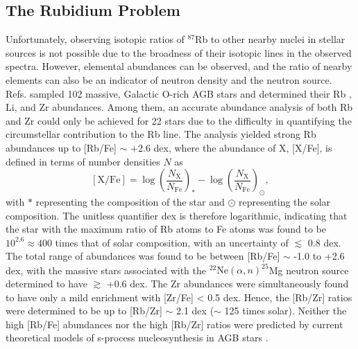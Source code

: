 \subsection{The Rubidium Problem} \label{subsec:Rb_Problem}


Unfortunately, observing isotopic ratios of $^{87}$Rb to other nearby nuclei in stellar sources is not possible due to the broadness of their isotopic lines in the observed spectra. However, elemental abundances can be observed, and the ratio of nearby elements can also be an indicator of neutron density and the neutron source. Refs. \cite{Garcia2006,Garcia2007} sampled 102 massive, Galactic O-rich AGB stars and determined their Rb \cite{Garcia2006}, Li, and Zr \cite{Garcia2007} abundances. Among them, an accurate abundance analysis of both Rb and Zr could only be achieved for 22 stars due to the difficulty in quantifying the circumstellar contribution to the Rb line. The analysis yielded strong Rb abundances up to [Rb/Fe] $\sim$ +2.6 dex, where the abundance of X, [X/Fe], is defined in terms of number densities $N$ as
\begin{equation} \label{eqn:abundance}
[\mathrm{X}/\mathrm{Fe}] = \log\left( \frac{N_{\mathrm{X}}}{N_{\mathrm{Fe}}} \right)_{\ast} - \log\left( \frac{N_{\mathrm{X}}}{N_{\mathrm{Fe}}} \right)_{\odot},
\end{equation}
with $\ast$ representing the composition of the star and $\odot$ representing the solar composition. The unitless quantifier dex is therefore logarithmic, indicating that the star with the maximum ratio of  Rb atoms to Fe atoms was found to be $10^{2.6} \approx 400$ times that of solar composition, with an uncertainty of $\lesssim$ 0.8 dex. The total range of abundances was found to be between [Rb/Fe] $\sim$ -1.0 to +2.6 dex, with the massive stars associated with the $^{22}\mathrm{Ne}(\alpha,n)^{25}$Mg neutron source determined to have $\gtrsim$ +0.6 dex. The Zr abundances were simultaneously found to have only a mild enrichment with [Zr/Fe] < 0.5 dex. Hence, the [Rb/Zr] ratios were determined to be up to [Rb/Zr] $\sim$ 2.1 dex ($\sim$ 125 times solar). Neither the high [Rb/Fe] abundances nor the high [Rb/Zr] ratios were predicted by current theoretical models of s-process nucleosynthesis in AGB stars \cite{Raai2012,Karakas2012}. 

